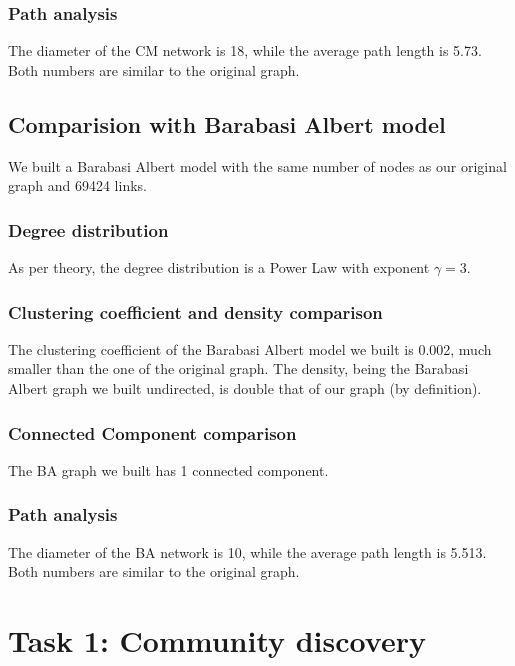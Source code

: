 \documentclass[sigchi]{acmart}
\begin{document}
\subsubsection{Path analysis}
The diameter of the CM network is 18, while the average path length is 5.73. Both numbers are similar to the original graph.

\subsection{Comparision with Barabasi Albert model}
We built a Barabasi Albert \cite{barabasialbert} model with the same number of nodes as our original graph and 69424 links.
\subsubsection{Degree distribution} As per theory, the degree distribution is a Power Law with exponent $\gamma = 3$.
\subsubsection{Clustering coefficient and density comparison}
The clustering coefficient of the Barabasi Albert model we built is 0.002, much smaller than the one of the original graph. The density, being the Barabasi Albert graph we built undirected, is double that of our graph (by definition).
\subsubsection{Connected Component comparison}
The BA graph we built has 1 connected component.
\subsubsection{Path analysis}
The diameter of the BA network is 10, while the average path length is 5.513. Both numbers are similar to the original graph.




\section{Task 1: Community discovery}
\end{document}
